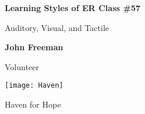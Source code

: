 \begin{titlepage}
    \begin{center}
        \vspace*{1cm}
        
        \textbf{Learning Styles of ER Class \#57}
        
        \vspace{0.5cm}
        Auditory, Visual, and Tactile
        
        \vspace{1.5cm}
        
        \textbf{John Freeman}
        
        \vfill
        
        Volunteer
        
        \vspace{0.8cm}
        
        \texttt{[image: Haven]}
        
        Haven for Hope
        
    \end{center}
\end{titlepage}